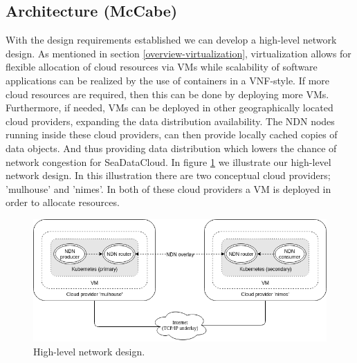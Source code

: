 \subsection{Architecture (McCabe)}
\label{planning-architecture}
With the design requirements established we can develop a high-level network design. As mentioned in section \ref{overview-virtualization}, virtualization allows for flexible allocation of cloud resources via VMs while scalability of software applications can be realized by the use of containers in a VNF-style. If more cloud resources are required, then this can be done by deploying more VMs. Furthermore, if needed, VMs can be deployed in other geographically located cloud providers, expanding the data distribution availability. The NDN nodes running inside these cloud providers, can then provide locally cached copies of data objects. And thus providing data distribution which lowers the chance of network congestion for SeaDataCloud. In figure \ref{fig:high-level-network-design} we illustrate our high-level network design. In this illustration there are two conceptual cloud providers; 'mulhouse' and 'nimes'. In both of these cloud providers a VM is deployed in order to allocate resources.

\begin{figure}[H]
\centering
\includegraphics[width=\columnwidth]{Images/high-level-network-design.png}
\caption{High-level network design.}
\label{fig:high-level-network-design}
\end{figure}

